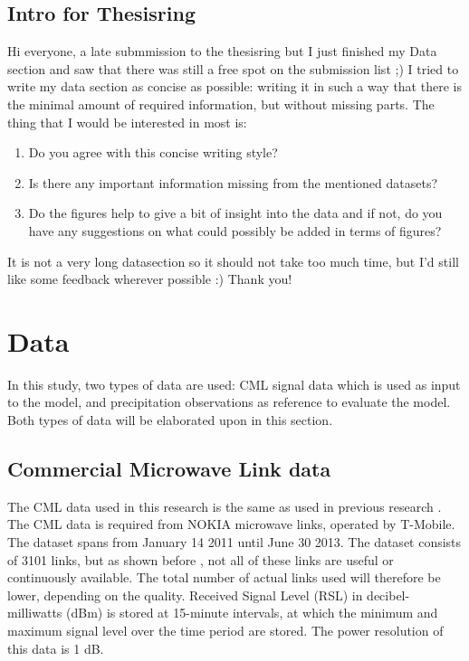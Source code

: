 \documentclass[twocolumn, 10pt, a4paper]{memoir}
\begin{document}
	
	\thispagestyle{empty}                    %
	\pagestyle{empty}
	\frontmatter
	\firmlists 
	
	\section{Intro for Thesisring}
	Hi everyone, a late submmission to the thesisring but I just finished my Data section and saw that there was still a free spot on the submission list ;) 
	\newline
	I tried to write my data section as concise as possible: writing it in such a way that there is the minimal amount of required information, but without missing parts. The thing that I would be interested in most is:
	\begin{enumerate}
		\item Do you agree with this concise writing style?
		\item Is there any important information missing from the mentioned datasets?
		\item Do the figures help to give a bit of insight into the data and if not, do you have any suggestions on what could possibly be added in terms of figures?
	\end{enumerate} 
	It is not a very long datasection so it should not take too much time, but I'd still like some feedback wherever possible :)
	\newline
	Thank you! 
	\openany
	\chapter{Data}\vspace{-6mm}\label{ch: field}
	In this study, two types of data are used: CML signal data which is used as input to the model, and precipitation observations as reference to evaluate the model. Both types of data will be elaborated upon in this section.
	
	\section{Commercial Microwave Link data} \label{sec: CML data}
	The CML data used in this research is the same as used in previous research .
	The CML data is required from NOKIA microwave links, operated by T-Mobile. The dataset spans from January 14 2011 until June 30 2013. The dataset consists of  3101 links, but as shown before , not all of these links are useful or continuously available. The total number of actual links used will therefore be lower, depending on the quality. Received Signal Level (RSL) in decibel-milliwatts (dBm) is stored at 15-minute intervals, at which the minimum and maximum signal level over the time period are stored. The power resolution of this data is 1 dB. 
	
\end{document}

